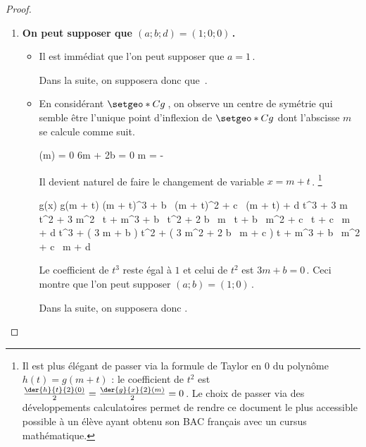 \begin{proof}
	\leavevmode
	\begin{enumerate}
		\item \textbf{On peut supposer que $(a ; b ; d) = (1 ; 0 ; 0)$\,.}
		\begin{itemize}
			\item Il est immédiat que l'on peut supposer que $a = 1$\,. 
				          
			Dans la suite, on supposera donc que \,.

			\item En considérant $\setgeo*{C}{g}$\,, on observe un centre de symétrie qui semble être l'unique point d'inflexion de $\setgeo*{C}{g}$ dont l'abscisse $m$ se calcule comme suit.
					      
			\smallskip
			\noindent\kern-5pt
			\begin{stepcalc}[style = sar, ope = \iff]
				(m) = 0
			\explnext{}
				6m + 2b = 0
			\explnext{}
				m = - 
			\end{stepcalc}
					      
			\smallskip
			\noindent
			Il devient naturel de faire le changement de variable $x = m + t$\,.
			\footnote{
				Il est plus élégant de passer via la formule de Taylor en $0$ du polynôme $h(t) = g(m + t)$ : le coefficient de $t^2$ est $\frac{\der{h}{t}{2}(0)}{2} = \frac{\der{g}{x}{2}(m)}{2} = 0$\,.
				Le choix de passer via des développements calculatoires permet de rendre ce document le plus accessible possible à un élève ayant obtenu son BAC français avec un cursus mathématique.
			} 
			
			\smallskip
			\noindent\kern-5pt
			\begin{stepcalc}[style = sar]
				g(x)
				\explnext{}
				g(m + t)
				\explnext{}
				(m + t)^3 + b \, (m + t)^2 + c \, (m + t) + d
				\explnext{}
				  t^3 + 3 m \, t^2 + 3 m^2 \, t    + m^3
			          + b \, t^2   + 2 b \, m \, t + b \, m^2
				                   + c \, t        + c \, m + d
				\explnext{}
				    t^3 
				  + ( 3 m + b ) t^2
				  + ( 3 m^2 + 2 b \, m + c ) t    
				  + m^3 + b \, m^2 + c \, m + d
			\end{stepcalc} 
			
			\smallskip
			\noindent
			Le coefficient de $t^3$ reste égal à $1$ et celui de $t^2$ est $3m + b = 0$\,. Ceci montre que l'on peut supposer $(a ; b) = (1 ; 0)$\,.
			
			Dans la suite, on supposera donc .
		\end{itemize}



\end{enumerate}
\end{proof}
